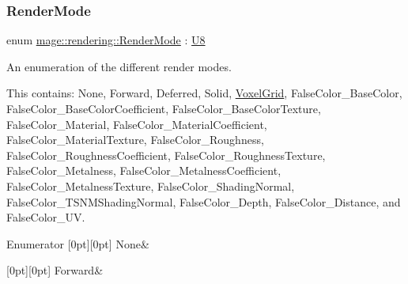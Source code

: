 \subsubsection{\texorpdfstring{Render\+Mode}{RenderMode}}
{\footnotesize\ttfamily enum \mbox{\hyperlink{namespacemage_1_1rendering_aeb14ce7610cc9391f4e01be027b91dcc}{mage\+::rendering\+::\+Render\+Mode}} \+: \mbox{\hyperlink{namespacemage_a30677c03d683c4c35630c25f6ff3fb7f}{U8}}\hspace{0.3cm}{\ttfamily [strong]}}

An enumeration of the different render modes.

This contains\+: {\ttfamily None}, {\ttfamily Forward}, {\ttfamily Deferred}, {\ttfamily Solid}, {\ttfamily \mbox{\hyperlink{classmage_1_1rendering_1_1_voxel_grid}{Voxel\+Grid}}}, {\ttfamily False\+Color\+\_\+\+Base\+Color}, {\ttfamily False\+Color\+\_\+\+Base\+Color\+Coefficient}, {\ttfamily False\+Color\+\_\+\+Base\+Color\+Texture}, {\ttfamily False\+Color\+\_\+\+Material}, {\ttfamily False\+Color\+\_\+\+Material\+Coefficient}, {\ttfamily False\+Color\+\_\+\+Material\+Texture}, {\ttfamily False\+Color\+\_\+\+Roughness}, {\ttfamily False\+Color\+\_\+\+Roughness\+Coefficient}, {\ttfamily False\+Color\+\_\+\+Roughness\+Texture}, {\ttfamily False\+Color\+\_\+\+Metalness}, {\ttfamily False\+Color\+\_\+\+Metalness\+Coefficient}, {\ttfamily False\+Color\+\_\+\+Metalness\+Texture}, {\ttfamily False\+Color\+\_\+\+Shading\+Normal}, {\ttfamily False\+Color\+\_\+\+T\+S\+N\+M\+Shading\+Normal}, {\ttfamily False\+Color\+\_\+\+Depth}, {\ttfamily False\+Color\+\_\+\+Distance}, and {\ttfamily False\+Color\+\_\+\+UV}. \begin{DoxyEnumFields}{Enumerator}
[0pt][0pt]{}\mbox{\label{namespacemage_1_1rendering_aeb14ce7610cc9391f4e01be027b91dcca6adf97f83acf6453d4a6a4b1070f3754}} 
None&\\
\hline

[0pt][0pt]{}\mbox{\label{namespacemage_1_1rendering_aeb14ce7610cc9391f4e01be027b91dcca67d2f6740a8eaebf4d5c6f79be8da481}} 
Forward&\\
\hline


\end{DoxyEnumFields}

